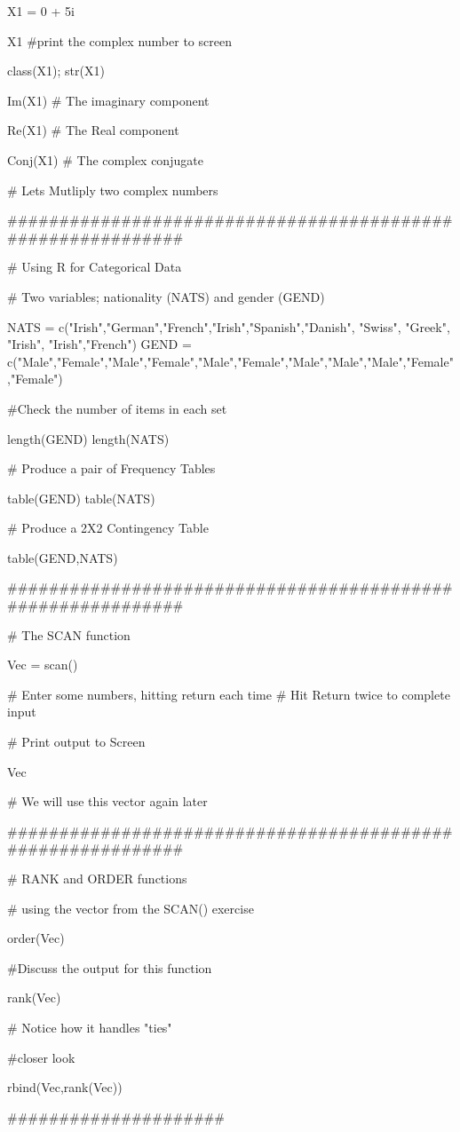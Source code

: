 X1 = 0 + 5i

X1	#print the complex number to screen

class(X1); str(X1)

Im(X1)		# The imaginary component

Re(X1)		# The Real component	

Conj(X1)	# The complex conjugate 

# Lets Mutliply two complex numbers

############################################################

# Using R for Categorical Data

# Two variables; nationality (NATS) and gender (GEND)

NATS = c("Irish","German","French","Irish","Spanish","Danish", "Swiss", "Greek", "Irish", "Irish","French")
GEND = c("Male","Female","Male","Female","Male","Female","Male","Male","Male","Female","Female")


#Check the number of items in each set

length(GEND)
length(NATS) 

# Produce a pair of Frequency Tables

table(GEND)
table(NATS)

# Produce a 2X2 Contingency Table

table(GEND,NATS)

############################################################

# The SCAN function

Vec = scan()

# Enter some numbers, hitting return each time
# Hit Return twice to complete input

# Print output to Screen

Vec 

# We will use this vector again later

############################################################

# RANK and ORDER functions

# using the vector from the SCAN() exercise

order(Vec)

	#Discuss the output for this function

rank(Vec)

	# Notice how it handles "ties"	


#closer look

rbind(Vec,rank(Vec))

#####################

